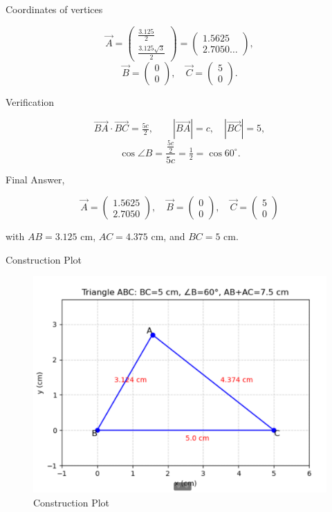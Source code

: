 \documentclass{beamer}
\begin{document}
\begin{frame}
 Coordinates of vertices

\[
\vec{A} = \begin{pmatrix}\tfrac{3.125}{2}\\[4pt]\tfrac{3.125\sqrt{3}}{2}\end{pmatrix}
= \begin{pmatrix}1.5625\\[4pt]2.7050\ldots\end{pmatrix},
\]
\[
\vec{B}=\begin{pmatrix}0\\0\end{pmatrix}, \quad
\vec{C}=\begin{pmatrix}5\\0\end{pmatrix}.
\]

Verification

\[
\vec{BA}\cdot \vec{BC} = \tfrac{5c}{2}, \qquad
|\vec{BA}|=c, \quad |\vec{BC}|=5,
\]
\[
\cos \angle B = \frac{\tfrac{5c}{2}}{5c} = \tfrac{1}{2} = \cos 60^\circ.
\]

Final Answer,

\[
\boxed{
\vec{A} = \begin{pmatrix}1.5625\\[4pt]2.7050\end{pmatrix},\quad
\vec{B} = \begin{pmatrix}0\\0\end{pmatrix},\quad
\vec{C} = \begin{pmatrix}5\\0\end{pmatrix}
}
\]

with $AB=3.125$ cm, $AC=4.375$ cm, and $BC=5$ cm.\\
\end{frame}

\begin{frame}{Construction Plot}
\begin{figure}
    \centering
    \includegraphics[width=1\linewidth]{figs/image.png}
    \caption{Construction Plot}
    \label{fig:figs/image.png}
\end{figure}
\end{frame}
\end{document}
